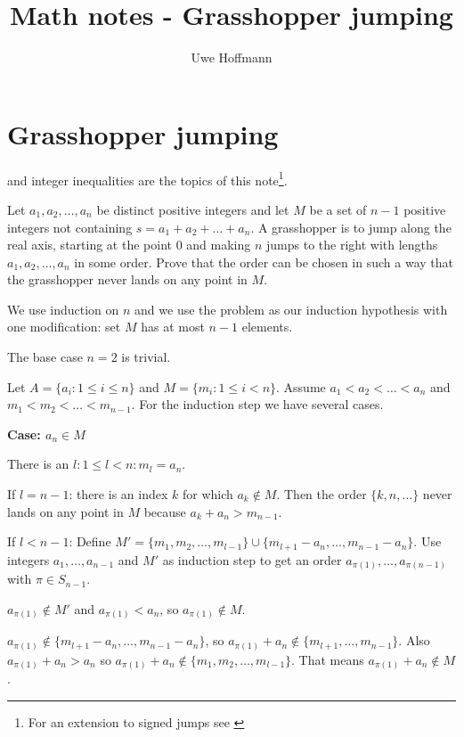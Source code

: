 

\title{Math notes - Grasshopper jumping}
\author{Uwe Hoffmann}



\setcounter{chapter}{1}
\section*{Grasshopper jumping}

 and integer inequalities are the topics of this note\footnote{For an extension to signed jumps see \cite{SignedGrasshopper}}.

\vspace{10 mm}
\begin{problem}
Let $a_1, a_2, \ldots, a_n$ be distinct positive integers and let $M$ be a set of $n-1$ positive integers not containing $s = a_1 + a_2 + \ldots + a_n$. A grasshopper is to jump along the real axis, starting at the point $0$ and making $n$ jumps to the right with lengths $a_1, a_2, \ldots, a_n$ in some order. Prove that the order can be chosen in such a way that the grasshopper never lands on any point in $M$. 
\end{problem}

We use induction on $n$ and we use the problem as our induction hypothesis with one modification: set $M$ has at most $n-1$ elements.

The base case $n=2$ is trivial.

Let $A = \{a_i: 1 \leq i \leq n\}$ and $M= \{m_i: 1 \leq i < n\}$. Assume $a_1 < a_2 < \ldots < a_n$ and $m_1 < m_2 < \ldots < m_{n-1}$.  For the induction step we have several cases.

\noindent \textbf{Case: $a_n \in M$}

There is an $l : 1 \leq l < n: m_l = a_n$.

If $l = n - 1$: there is an index $k$ for which $a_k \notin M$. Then the order $\{k, n, \ldots\}$ never lands on any point in $M$ because $a_k + a_n > m_{n-1}$.

If $l < n - 1$: Define $M' = \{m_1, m_2, \ldots, m_{l-1}\} \cup \{m_{l+1} - a_n, \ldots, m_{n-1} - a_n\}$. Use integers $a_1, \ldots, a_{n-1}$ and $M'$ as induction step to get an order $a_{\pi(1)}, \ldots, a_{\pi(n-1)}$ with $\pi \in S_{n-1}$.

$a_{\pi(1)} \notin M'$ and $a_{\pi(1)} < a_n$, so $a_{\pi(1)} \notin M$.

$a_{\pi(1)} \notin \{m_{l+1} - a_n, \ldots, m_{n-1} - a_n\}$, so $a_{\pi(1)} + a_n \notin \{m_{l+1}, \ldots, m_{n-1}\}$. Also $a_{\pi(1)} + a_n > a_n$ so $a_{\pi(1)} + a_n \notin \{m_1, m_2, \ldots, m_{l-1}\}$. That means $a_{\pi(1)} + a_n \notin M$.

